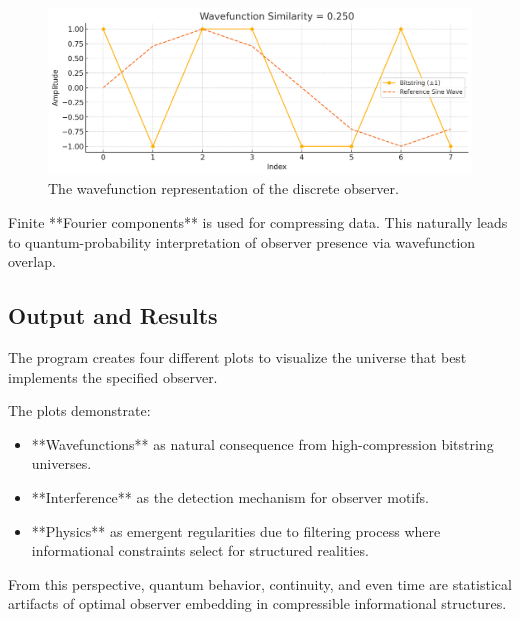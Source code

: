 \documentclass[11pt]{article}
\begin{document}
\begin{figure}[h!]
    \centering
    \includegraphics[width=1.0\textwidth]{figures/wavefunction_similarity.png}
    \caption{The wavefunction representation of the discrete observer.}
    \label{fig:wavefunction_similarity}
\end{figure}


Finite **Fourier components** is used for compressing data.
This naturally leads to  quantum-probability interpretation of observer presence via wavefunction overlap.


\subsection{Output and Results}

The program creates four different plots to visualize the universe that best implements the specified observer.

The plots demonstrate:

\begin{itemize}
    \item **Wavefunctions** as natural consequence from high-compression bitstring universes.
    \item **Interference** as the detection mechanism for observer motifs.
    \item **Physics** as emergent regularities due to filtering process where informational constraints select for structured realities.
\end{itemize}

From this perspective, quantum behavior, continuity, and even time are statistical artifacts of optimal observer embedding in
compressible informational structures.
\end{document}
